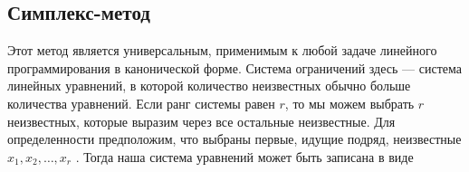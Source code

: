\documentclass{article}
\begin{document}
\subsection{Симплекс-метод}
Этот метод является универсальным, применимым к любой задаче линейного программирования в канонической форме. Система ограничений здесь — система линейных уравнений, в которой количество неизвестных обычно  больше  количества  уравнений. Если  ранг  системы равен $r$, то мы можем выбрать $r$ неизвестных, которые выразим через все остальные неизвестные. Для определенности предположим, что выбраны  первые, идущие подряд, неизвестные $x_1,x_2,\dots,x_r$ . Тогда наша система уравнений может быть записана в виде
\end{document}

